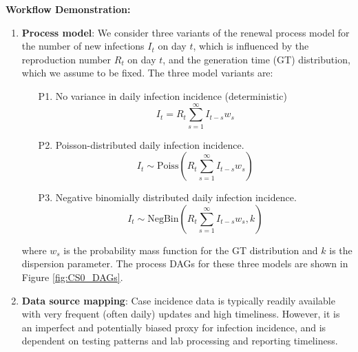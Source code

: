 \documentclass{article}
\begin{document}

\textbf{Workflow Demonstration:}
\begin{enumerate}
    \item \textbf{Process model}: We consider three variants of the renewal process model for the number of new infections $I_t$ on day $t$, which is influenced by the reproduction number $R_t$ on day $t$, and the generation time (GT) distribution, which we assume to be fixed. The three model variants are:
\begin{itemize}
    \item[P1.] No variance in daily infection incidence (deterministic)
    \begin{equation} \label{eq:infections_P1}
        I_t = R_t \sum_{s=1}^\infty I_{t-s}w_s 
    \end{equation}
    \item[P2.] Poisson-distributed daily infection incidence.
        \begin{equation} \label{eq:infections_P2}
        I_t \sim \mathrm{Poiss}\left( R_t \sum_{s=1}^\infty I_{t-s}w_s  \right)
    \end{equation}
    \item[P3.] Negative binomially distributed daily infection incidence. 
            \begin{equation} \label{eq:infections_P3}
        I_t \sim \mathrm{NegBin}\left( R_t \sum_{s=1}^\infty I_{t-s}w_s, k  \right)
    \end{equation}
\end{itemize}
where $w_s$ is the probability mass function for the GT distribution and $k$ is the dispersion parameter. 
The process DAGs for these three models are shown in Figure \ref{fig:CS0_DAGs}.

 
\item \textbf{Data source mapping}: Case incidence data is typically readily available with very frequent (often daily) updates and high timeliness. However, it is an imperfect and potentially biased proxy for infection incidence, and is dependent on testing patterns and lab processing and reporting timeliness. 



\end{enumerate}
\end{document}
